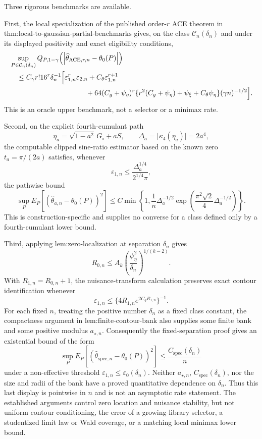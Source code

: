 Three rigorous benchmarks are available.

First, the local specialization of the published order-\(r\) ACE theorem in
\(\text{thm:local-to-gaussian-partial-benchmarks}\) gives, on the class
\(\mathcal C_n(\delta_n)\) and under its displayed positivity and exact
eligibility conditions,
\[
\begin{aligned}
 &\sup_{P\in\mathcal C_n(\delta_n)}
 Q_{P,1-\gamma}
 \!\left(\left|\widehat\theta_{\mathrm{ACE},r,n}-\theta_0(P)\right|\right)\\
 &\quad\le
 C_{\gamma}r!16^r\delta_n^{-1}
 \Bigl[
   \varepsilon_{1,n}^r\varepsilon_{2,n}
   +C_{\theta}\varepsilon_{1,n}^{r+1}\\
 &\hspace{38mm}
   +64(C_g+\psi_{\eta})^r
    \{r^2(C_g+\psi_{\eta})+\psi_{\xi}+C_{\theta}\psi_{\eta}\}
    (\gamma n)^{-1/2}
 \Bigr].
\end{aligned}
\]
This is an oracle upper benchmark, not a selector or a minimax rate.

Second, on the explicit fourth-cumulant path
\[
 \eta_a=\sqrt{1-a^2}\,G_{\circ}+aS,
 \qquad
 \Delta_a=\lvert\kappa_4(\eta_a)\rvert=2a^4,
\]
the computable clipped sine-ratio estimator based on the known zero
\(t_a=\pi/(2a)\) satisfies, whenever
\[
 \varepsilon_{1,n}
 \leq\frac{\Delta_a^{1/4}}{2^{1/4}\pi},
\]
the pathwise bound
\[
 \sup_P E_P\!\left[
   (\widehat\theta_{a,n}-\theta_0(P))^2
 \right]
 \leq
 C\min\!\left\{
  1,\frac{1}{n}\Delta_a^{-1/2}
  \exp\!\left(
    \frac{\pi^2\sqrt2}{4}\Delta_a^{-1/2}
  \right)
 \right\}.
\]
This is construction-specific and supplies no converse for a class defined
only by a fourth-cumulant lower bound.

Third, applying \(\text{lem:zero-localization}\) at separation \(\delta_n\)
gives
\[
 R_{0,n}\leq A_k
 \left(\frac{\psi_{\eta}^2}{\delta_n}\right)^{1/(k-2)}.
\]
With \(R_{1,n}=R_{0,n}+1\), the nuisance-transform calculation preserves
exact contour identification whenever
\[
 \varepsilon_{1,n}
 \leq\{4R_{1,n}e^{2C_gR_{1,n}}\}^{-1}.
\]
For each fixed \(n\), treating the positive number \(\delta_n\) as a fixed
class constant, the compactness argument in
\(\text{lem:finite-contour-bank}\) also supplies some finite bank and some
positive modulus \(a_{\star,n}\).  Consequently the fixed-separation proof
gives an existential bound of the form
\[
 \sup_P E_P\!\left[
  (\widehat\theta_{\mathrm{spec},n}-\theta_0(P))^2
 \right]
 \leq \frac{C_{\mathrm{spec}}(\delta_n)}{n}
\]
under a non-effective threshold
\(\varepsilon_{1,n}\leq\varepsilon_{0}(\delta_n)\).  Neither
\(a_{\star,n}\), \(C_{\mathrm{spec}}(\delta_n)\), nor the size and radii of
the bank have a proved quantitative dependence on \(\delta_n\).  Thus this
last display is pointwise in \(n\) and is not an asymptotic rate statement.
The established arguments control zero location and nuisance stability, but
not uniform contour conditioning, the error of a growing-library selector,
a studentized limit law or Wald coverage, or a matching local minimax lower
bound.